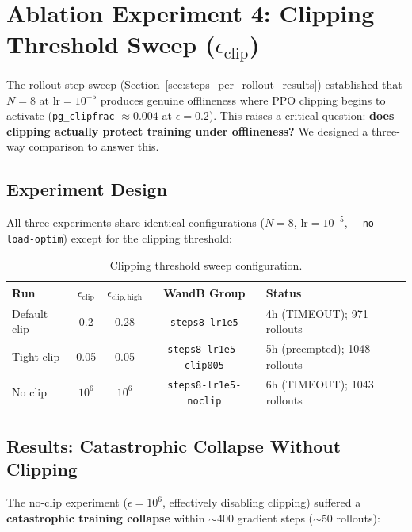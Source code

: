 \documentclass[11pt,a4paper]{article}
\begin{document}
\section{Ablation Experiment 4: Clipping Threshold Sweep ($\epsilon_{\mathrm{clip}}$)}
\label{sec:clip_sweep_results}

The rollout step sweep (Section~\ref{sec:steps_per_rollout_results}) established
that $N = 8$ at $\mathrm{lr} = 10^{-5}$ produces genuine offlineness where PPO
clipping begins to activate (\texttt{pg\_clipfrac} $\approx 0.004$ at
$\epsilon = 0.2$). This raises a critical question: \textbf{does clipping
actually protect training under offlineness?} We designed a three-way comparison
to answer this.

\subsection{Experiment Design}

All three experiments share identical configurations ($N = 8$,
$\mathrm{lr} = 10^{-5}$, \texttt{-{}-no-load-optim}) except for the clipping
threshold:

\begin{table}[H]
\centering
\caption{Clipping threshold sweep configuration.}
\label{tab:clip_sweep_config}
\begin{tabular}{@{}lcccl@{}}
\toprule
\textbf{Run} & $\epsilon_{\mathrm{clip}}$ & $\epsilon_{\mathrm{clip,high}}$ & \textbf{WandB Group} & \textbf{Status} \\
\midrule
Default clip  & 0.2  & 0.28 & \texttt{steps8-lr1e5}          & 4h (TIMEOUT); 971 rollouts \\
Tight clip    & 0.05 & 0.05 & \texttt{steps8-lr1e5-clip005}  & 5h (preempted); 1048 rollouts \\
No clip       & $10^6$ & $10^6$ & \texttt{steps8-lr1e5-noclip} & 6h (TIMEOUT); 1043 rollouts \\
\bottomrule
\end{tabular}
\end{table}

\subsection{Results: Catastrophic Collapse Without Clipping}

The no-clip experiment ($\epsilon = 10^6$, effectively disabling clipping)
suffered a \textbf{catastrophic training collapse} within $\sim$400 gradient
steps ($\sim$50 rollouts):
\end{document}
